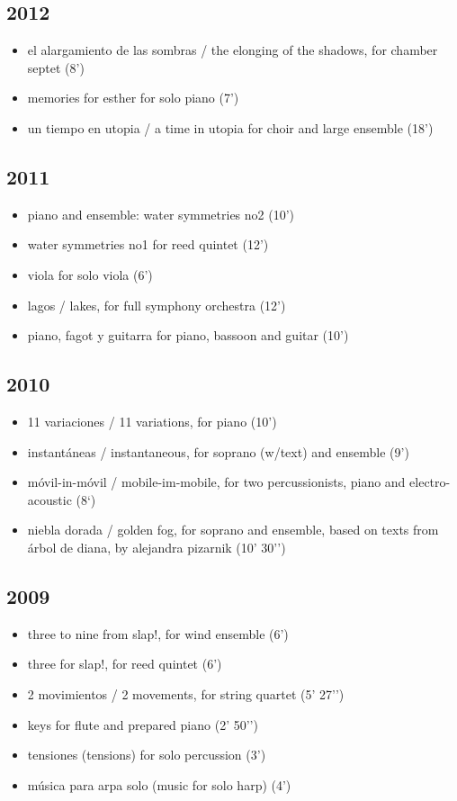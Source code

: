 \documentclass{book}
\begin{document}
\subsection{2012}
\begin{itemize}
\item el alargamiento de las sombras / the elonging of the shadows, for chamber septet (8’)
\item memories for esther for solo piano (7’)
\item un tiempo en utopia / a time in utopia for choir and large ensemble (18’)
\end{itemize}
\subsection{2011}
\begin{itemize}
\item piano and ensemble: water symmetries no2 (10’)
\item water symmetries no1 for reed quintet (12’)
\item viola for solo viola (6’)
\item lagos / lakes, for full symphony orchestra (12’)
\item piano, fagot y guitarra for piano, bassoon and guitar (10’)
\end{itemize}
\subsection{2010}
\begin{itemize}
\item 11 variaciones / 11 variations, for piano (10’)
\item instantáneas / instantaneous, for soprano (w/text) and ensemble (9’)
\item móvil-in-móvil / mobile-im-mobile, for two percussionists, piano and electro-acoustic (8‘)
\item niebla dorada / golden fog, for soprano and ensemble, based on texts from árbol de diana, by alejandra pizarnik (10’ 30’’)
\end{itemize}
\subsection{2009}
\begin{itemize}
\item three to nine from slap!, for wind ensemble (6’)
\item three for slap!, for reed quintet (6’)
\item 2 movimientos / 2 movements, for string quartet (5’ 27’’)
\item keys for flute and prepared piano (2’ 50’’)
\item tensiones (tensions) for solo percussion (3’)
\item música para arpa solo (music for solo harp) (4’)
\end{itemize}
\end{document}
